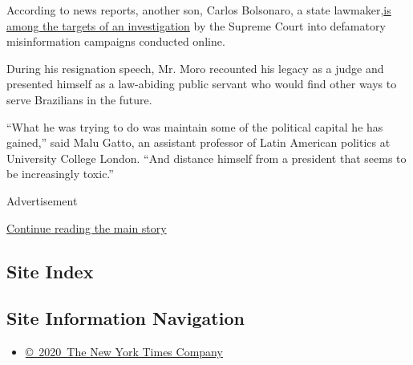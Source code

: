 According to news reports, another son, Carlos Bolsonaro, a state
lawmaker,\href{https://istoe.com.br/pf-teria-identificado-carlos-bolsonaro-como-mentor-de-fake-news-contra-stf/}{is
among the targets of an investigation} by the Supreme Court into
defamatory misinformation campaigns conducted online.

During his resignation speech, Mr. Moro recounted his legacy as a judge
and presented himself as a law-abiding public servant who would find
other ways to serve Brazilians in the future.

``What he was trying to do was maintain some of the political capital he
has gained,'' said Malu Gatto, an assistant professor of Latin American
politics at University College London. ``And distance himself from a
president that seems to be increasingly toxic.''

Advertisement

\protect\hyperlink{after-bottom}{Continue reading the main story}

\hypertarget{site-index}{%
\subsection{Site Index}\label{site-index}}

\hypertarget{site-information-navigation}{%
\subsection{Site Information
Navigation}\label{site-information-navigation}}

\begin{itemize}
\tightlist
\item
  \href{https://help.nytimes3xbfgragh.onion/hc/en-us/articles/115014792127-Copyright-notice}{©~2020~The
  New York Times Company}
\end{itemize}

